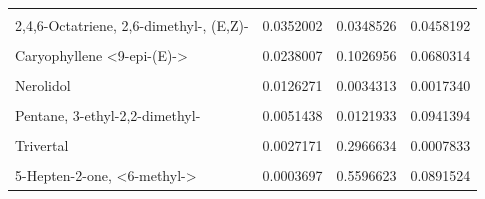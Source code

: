 \documentclass[12pt,final,CPage]{ufthesis}
\begin{document}
{\begin{table}
{\begin{tabular}[t]{lrrr}
  \cellcolor{gray!6}{Aromadendrene} & \cellcolor{gray!6}{0.0486886} & \cellcolor{gray!6}{0.1419599} & \cellcolor{gray!6}{0.2551968}\\
  2,4,6-Octatriene, 2,6-dimethyl-, (E,Z)- & 0.0352002 & 0.0348526 & 0.0458192\\
  \cellcolor{gray!6}{Calamenene} & \cellcolor{gray!6}{0.0292478} & \cellcolor{gray!6}{0.1013612} & \cellcolor{gray!6}{0.3343829}\\
  Caryophyllene <9-epi-(E)-> & 0.0238007 & 0.1026956 & 0.0680314\\
  \addlinespace
  \cellcolor{gray!6}{Ocimene, <trans-beta->} & \cellcolor{gray!6}{0.0200925} & \cellcolor{gray!6}{0.0135288} & \cellcolor{gray!6}{0.0222477}\\
  Nerolidol & 0.0126271 & 0.0034313 & 0.0017340\\
  \cellcolor{gray!6}{2-Hexen-1-ol, acetate, (E)-} & \cellcolor{gray!6}{0.0093561} & \cellcolor{gray!6}{0.0819047} & \cellcolor{gray!6}{0.0016911}\\
  Pentane, 3-ethyl-2,2-dimethyl- & 0.0051438 & 0.0121933 & 0.0941394\\
  \cellcolor{gray!6}{Myrcene <beta->} & \cellcolor{gray!6}{0.0029627} & \cellcolor{gray!6}{0.1348161} & \cellcolor{gray!6}{0.0120437}\\
  \addlinespace
  Trivertal & 0.0027171 & 0.2966634 & 0.0007833\\
  \cellcolor{gray!6}{2-Thujene} & \cellcolor{gray!6}{0.0013261} & \cellcolor{gray!6}{0.0817092} & \cellcolor{gray!6}{0.0081560}\\
  5-Hepten-2-one, <6-methyl-> & 0.0003697 & 0.5596623 & 0.0891524\\
  \bottomrule
  \end{tabular}}
  \end{table}
  \begin{table}


\end{table}}
\end{document}
